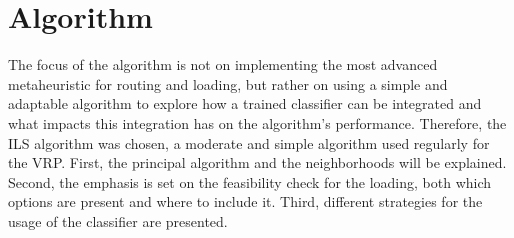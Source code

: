 \chapter{Algorithm}
\label{chap:algorithm}
The focus of the algorithm is not on implementing the most advanced metaheuristic for routing and loading,
but rather on using a simple and adaptable algorithm to explore how a trained classifier can be integrated and what
impacts this integration has on the algorithm’s performance. Therefore, the \gls{ILS}
algorithm was chosen, a moderate and simple algorithm used regularly for the \gls{VRP}. First, the principal
algorithm and the neighborhoods will be explained. Second, the emphasis is set on the feasibility check for the loading,
both which options are present and where to include it. Third, different strategies for the usage of the
classifier are presented.

